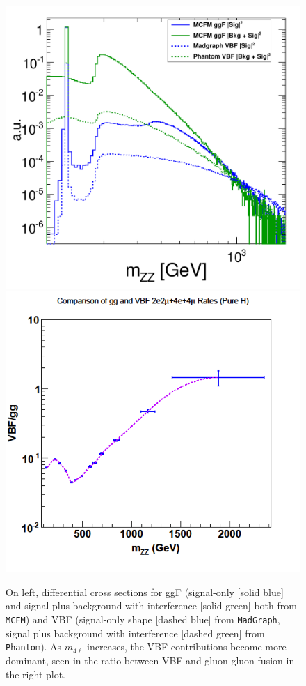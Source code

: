 \begin{figure}[htbp]
\begin{center}
\includegraphics[width=.45\linewidth]{HiggsProperties/figures/ggFvVBF_log_fix.eps}
\includegraphics[width=.45\linewidth]{HiggsProperties/figures/vbf2.png}
\caption[Comparisons Between VBF and ggF Productions for Off-Shell Region]{On left, differential cross sections for ggF (signal-only [solid blue] and signal plus background with interference [solid green] both from {\tt MCFM}) and VBF (signal-only shape [dashed blue] from {\tt MadGraph}, signal plus background with interference [dashed green] from {\tt Phantom}). As $m_{4\ell}$ increases, the VBF contributions become more dominant, seen in the ratio between VBF and gluon-gluon fusion in the right plot.}
\label{fig:VBFvggF_OffShell}
\end{center}
\end{figure}

